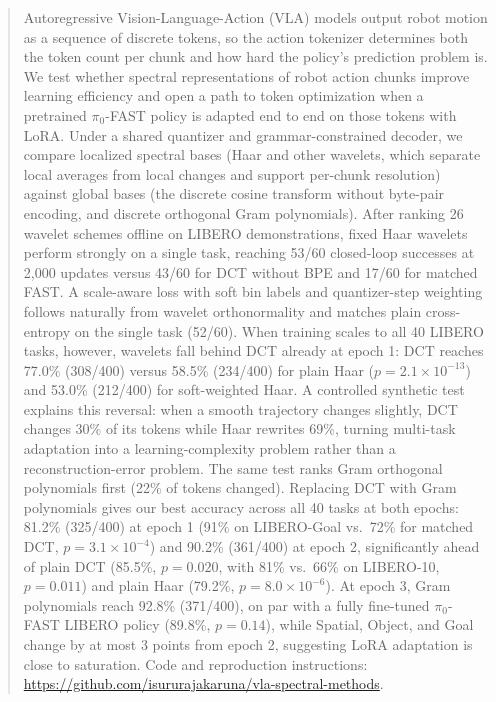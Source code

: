 \documentclass[10pt]{article}
\begin{document}
\begin{abstract}
\noindent
Autoregressive Vision-Language-Action (VLA) models output robot motion as a sequence of discrete tokens, so the action tokenizer determines both the token count per chunk and how hard the policy's prediction problem is.
We test whether spectral representations of robot action chunks improve learning efficiency and open a path to token optimization when a pretrained $\pi_0$-FAST policy is adapted end to end on those tokens with LoRA.
Under a shared quantizer and grammar-constrained decoder, we compare localized spectral bases (Haar and other wavelets, which separate local averages from local changes and support per-chunk resolution) against global bases (the discrete cosine transform without byte-pair encoding, and discrete orthogonal Gram polynomials).
After ranking 26 wavelet schemes offline on LIBERO demonstrations, fixed Haar wavelets perform strongly on a single task, reaching 53/60 closed-loop successes at 2,000 updates versus 43/60 for DCT without BPE and 17/60 for matched FAST.
A scale-aware loss with soft bin labels and quantizer-step weighting follows naturally from wavelet orthonormality and matches plain cross-entropy on the single task (52/60).
When training scales to all 40 LIBERO tasks, however, wavelets fall behind DCT already at epoch 1: DCT reaches 77.0\% (308/400) versus 58.5\% (234/400) for plain Haar ($p = 2.1\times 10^{-13}$) and 53.0\% (212/400) for soft-weighted Haar.
A controlled synthetic test explains this reversal: when a smooth trajectory changes slightly, DCT changes 30\% of its tokens while Haar rewrites 69\%, turning multi-task adaptation into a learning-complexity problem rather than a reconstruction-error problem.
The same test ranks Gram orthogonal polynomials first (22\% of tokens changed).
Replacing DCT with Gram polynomials gives our best accuracy across all 40 tasks at both epochs: 81.2\% (325/400) at epoch 1 (91\% on LIBERO-Goal vs.\ 72\% for matched DCT, $p = 3.1\times 10^{-4}$) and 90.2\% (361/400) at epoch 2, significantly ahead of plain DCT (85.5\%, $p = 0.020$, with 81\% vs.\ 66\% on LIBERO-10, $p = 0.011$) and plain Haar (79.2\%, $p = 8.0\times 10^{-6}$).
At epoch 3, Gram polynomials reach 92.8\% (371/400), on par with a fully fine-tuned $\pi_0$-FAST LIBERO policy (89.8\%, $p = 0.14$), while Spatial, Object, and Goal change by at most 3 points from epoch 2, suggesting LoRA adaptation is close to saturation.
Code and reproduction instructions: \url{https://github.com/isururajakaruna/vla-spectral-methods}.
\end{abstract}
\end{document}
